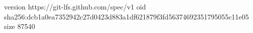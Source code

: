 version https://git-lfs.github.com/spec/v1
oid sha256:dcb1a0ea7352942c27d0423d883a1df621879f3fd56374692351795055c11e05
size 87540
